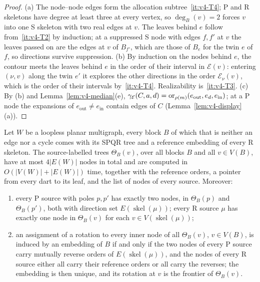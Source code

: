\begin{proof}
(a) The node--node edges form the allocation subtree~\ref{it:v4-T4}; P and
R skeletons have degree at least three at every vertex, so $\deg_B(v)=2$
forces $v$ into one S skeleton with two real edges at $v$. The
leaves behind $e$ follow from~\ref{it:v4-T2} by induction; at a suppressed S
node with edges $f,f'$ at $v$ the leaves passed on are the edges at $v$ of
$B_{f'}$, which are those of $B_e$ for the twin $e$ of $f$, so directions
survive suppression. (b) By induction on the nodes behind $e$, the contour
meets the leaves behind $e$ in the order of their interval in $\mathcal
E(v)$: entering $(\nu,v)$ along the twin $e'$ it explores the other
directions in the order $\mathcal E_\nu(v)$, which is the order of their
intervals by~\ref{it:v4-T4}. Realizability is~\ref{it:v4-T3}. (c) By (b) and
Lemma~\ref{lem:v4-median}(e), $\gamma_{\mathcal E}(C,a,d)=
\operatorname{or}_{\rho(m)}(e_{\mathrm{out}},e_d,e_{\mathrm{in}})$; at a P
node the expansions of $e_{\mathrm{out}}\neq e_{\mathrm{in}}$ contain edges
of $C$ (Lemma~\ref{lem:v4-display}(a)).
\end{proof}

\begin{lemma}\label{lem:v4-trees}
Let $W$ be a loopless planar multigraph, every block $B$ of which that is neither an
edge nor a cycle comes with its SPQR tree and a reference embedding of every
R skeleton. The source-labelled trees $\Theta_B(v)$, over all blocks $B$ and
all $v\in V(B)$, have at most $4|E(W)|$ nodes in total and are computed in
$O(|V(W)|+|E(W)|)$ time, together with the reference orders, a pointer from
every dart to its leaf, and the list of nodes of every source. Moreover:
\begin{enumerate}[label=(\alph*),nosep]
\item every P source with poles $p,p'$ has exactly two nodes, in
$\Theta_B(p)$ and $\Theta_B(p')$, both with direction set
$E(\operatorname{skel}(\mu))$; every R source $\mu$ has exactly one node in
$\Theta_B(v)$ for each $v\in V(\operatorname{skel}(\mu))$;
\item an assignment of a rotation to every inner node of all $\Theta_B(v)$,
$v\in V(B)$, is induced by an embedding of $B$ if and only if the two nodes
of every P source carry mutually reverse orders of
$E(\operatorname{skel}(\mu))$, and the nodes of every R source either all
carry their reference orders or all carry the reverses; the embedding is
then unique, and its rotation at $v$ is the frontier of $\Theta_B(v)$.
\end{enumerate}
\end{lemma}

